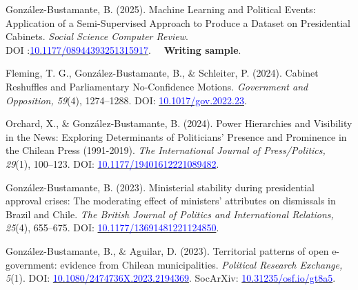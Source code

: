 \begin{publications}

\begin{benumerate}{10}

\item{González-Bustamante, B. (2025). Machine Learning and Political Events: Application of a Semi-Supervised Approach to Produce a Dataset on Presidential Cabinets. {\itshape Social Science Computer Review}. \\ DOI :\href{https://doi.org/10.1177/08944393251315917}{\textcolor{blue}{10.1177/08944393251315917}}. \faBriefcase\ $\,$ {\bfseries Writing sample}.}\vspace{1mm} %

\item{Fleming, T. G., González-Bustamante, B., \& Schleiter, P. (2024). Cabinet Reshuffles and Parliamentary No-Confidence Motions. {\itshape Government and Opposition, 59}(4), 1274--1288. DOI: \href{https://doi.org/10.1017/gov.2022.23}{\textcolor{blue}{10.1017/gov.2022.23}}.}\vspace{1mm}

\item{Orchard, X., \& González-Bustamante, B. (2024). Power Hierarchies and Visibility in the News: Exploring Determinants of Politicians’ Presence and Prominence in the Chilean Press (1991-2019). {\itshape The International Journal of Press/Politics, 29}(1), 100--123. DOI: \href{https://doi.org/10.1177/19401612221089482}{\textcolor{blue}{10.1177/19401612221089482}}.}\vspace{1mm}

\item{González-Bustamante, B. (2023). Ministerial stability during presidential approval crises: The moderating effect of ministers' attributes on dismissals in Brazil and Chile. {\itshape The British Journal of Politics and International Relations, 25}(4), 655--675. DOI: \href{https://doi.org/10.1177/13691481221124850}{\textcolor{blue}{10.1177/13691481221124850}}.}\vspace{1mm}

\item{González-Bustamante, B., \& Aguilar, D. (2023). Territorial patterns of open e-government: evidence from Chilean municipalities. {\itshape Political Research Exchange, 5}(1). DOI: \href{https://doi.org/10.1080/2474736X.2023.2194369}{\textcolor{blue}{10.1080/2474736X.2023.2194369}}. SocArXiv: \href{https://doi.org/10.31235/osf.io/gt8a5}{\textcolor{blue}{10.31235/osf.io/gt8a5}}.}\vspace{1mm}


\end{benumerate}
\end{publications}
